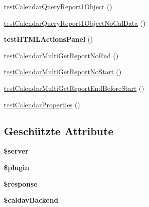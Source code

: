 \begin{DoxyCompactItemize}
\item 
\mbox{\hyperlink{class_sabre_1_1_cal_d_a_v_1_1_plugin_test_a7a81f2df564001a052676ef21a8f581f}{test\+Calendar\+Query\+Report1\+Object}} ()
\item 
\mbox{\hyperlink{class_sabre_1_1_cal_d_a_v_1_1_plugin_test_a877ee086c0598e5a37f455ac2a652fd7}{test\+Calendar\+Query\+Report1\+Object\+No\+Cal\+Data}} ()
\item 
\mbox{\label{class_sabre_1_1_cal_d_a_v_1_1_plugin_test_ab374b4e1f4f6f436c18b6540c2bf2b5b}} 
{\bfseries test\+H\+T\+M\+L\+Actions\+Panel} ()
\item 
\mbox{\hyperlink{class_sabre_1_1_cal_d_a_v_1_1_plugin_test_a07cc8f1b406bffcd2233d7d11d565c7b}{test\+Calendar\+Multi\+Get\+Report\+No\+End}} ()
\item 
\mbox{\hyperlink{class_sabre_1_1_cal_d_a_v_1_1_plugin_test_a7c844d70d0f748b1b1fbf4c254fa54c2}{test\+Calendar\+Multi\+Get\+Report\+No\+Start}} ()
\item 
\mbox{\hyperlink{class_sabre_1_1_cal_d_a_v_1_1_plugin_test_a1f30617b8105b05ee2b455f90ca8c46c}{test\+Calendar\+Multi\+Get\+Report\+End\+Before\+Start}} ()
\item 
\mbox{\hyperlink{class_sabre_1_1_cal_d_a_v_1_1_plugin_test_a694efa3cb791569ce6a5b357e0fa8871}{test\+Calendar\+Properties}} ()
\end{DoxyCompactItemize}
\subsection*{Geschützte Attribute}
\begin{DoxyCompactItemize}
\item 
\mbox{\label{class_sabre_1_1_cal_d_a_v_1_1_plugin_test_af887d841ab35e800a502e78e7f419a84}} 
{\bfseries \$server}
\item 
\mbox{\label{class_sabre_1_1_cal_d_a_v_1_1_plugin_test_a0a9c5e64093eeed1fdd1291accb436d8}} 
{\bfseries \$plugin}
\item 
\mbox{\label{class_sabre_1_1_cal_d_a_v_1_1_plugin_test_a1664ee54d23a1be30da5d133785f4e12}} 
{\bfseries \$response}
\item 
\mbox{\label{class_sabre_1_1_cal_d_a_v_1_1_plugin_test_a237727510186966fc8dae5f5678342db}} 
{\bfseries \$caldav\+Backend}
\end{DoxyCompactItemize}


